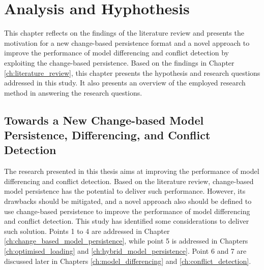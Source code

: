\chapter{Analysis and Hyphothesis}
\label{ch:analysis_and_hypothesis}

This chapter reflects on the findings of the literature review and presents the motivation for a new change-based persistence format and a novel approach to improve the performance of model differencing and conflict detection by exploiting the change-based persistence. Based on the findings in Chapter \ref{ch:literature_review}, this chapter presents the hypothesis and research questions addressed in this study. It also presents an overview of the employed research method in answering the research questions. 

\section{Towards a New Change-based Model Persistence, Differencing, and Conflict Detection}
\label{sec:a_new_change_based_persistence}
The research presented in this thesis aims at improving the performance of model differencing and conflict detection. 
Based on the literature review, change-based model persistence has the potential to deliver such performance. However, its drawbacks should be mitigated, and a novel approach also should be defined to use change-based persistence to improve the performance of model differencing and conflict detection. This study has identified some considerations to deliver such solution. Points 1 to 4 are addressed in Chapter \ref{ch:change_based_model_persistence}, while point 5 is addressed in Chapters \ref{ch:optimised_loading} and \ref{ch:hybrid_model_persistence}. Point 6 and 7 are discussed later in Chapters \ref{ch:model_differencing} and \ref{ch:conflict_detection}. 

